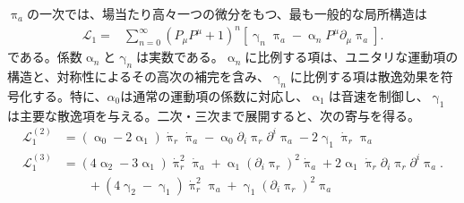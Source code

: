 \documentclass[a4paper,11pt,oneside]{article}
\theoremstyle{definition}
\numberwithin{equation}{section}
\begin{document}
\(\uppi_a\)の一次では、場当たり高々一つの微分をもつ、最も一般的な局所構造は
\begin{align}
        \mathcal{L}_1 = & \sum_{n=0}^\infty \left( P_\mu P^\mu  +1\right)^{n} \left[ \upgamma_n \uppi_{a} -\upalpha_n P^\mu \partial_\mu \uppi_{a}  \right].
    \end{align}
である。係数\(\upalpha_n\)と\(\upgamma_n\)は実数である。\(\upalpha_n\)に比例する項は、ユニタリな運動項の構造と、対称性によるその高次の補完を含み、\(\upgamma_n\)に比例する項は散逸効果を符号化する。特に、\(\alpha_0\)は通常の運動項の係数に対応し、\(\upalpha_1\)は音速を制御し、\(\upgamma_1\)は主要な散逸項を与える。二次・三次まで展開すると、次の寄与を得る。
\begin{align}
        \mathcal{L}_1^{(2)} &= \left( \upalpha_0 -2 \upalpha_1\right) \dot{\uppi}_{r} \dot{\uppi}_{a} - \upalpha_0 \partial_i \uppi_{r}  \partial^i \uppi_{a} - 2 \upgamma_1  \dot{\uppi}_{r} \uppi_a \\
                \mathcal{L}_1^{(3)} &=  \left(4 \upalpha_2 -3\upalpha_1 \right) \dot{\uppi}^2_{r} \dot{\uppi}_{a} + \upalpha_1 \left(\partial_i \uppi_{r} \right)^2 \dot{\uppi}_a + 2 \upalpha_1  \dot{\uppi}_{r}	\partial_i \uppi_{r}  \partial^i \uppi_{a} \Big.\nonumber \\
        &\qquad + \left(4 \upgamma_2 -\upgamma_1 \right)  \dot{\uppi}^2_{r} \uppi_{a}	+ \upgamma_1 	\left(\partial_i \uppi_{r} \right)^2 \uppi_a 
    \end{align}
    
\end{document}
